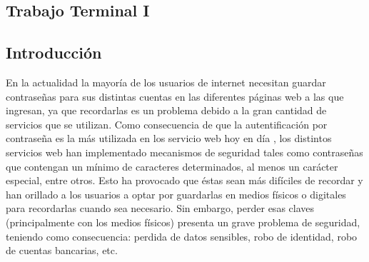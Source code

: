 \documentclass[12pt, a4paper, titlepage]{report}
\begin{document}
	\begin{appendix}
		\renewcommand*\contentsname{{\textcolor{azulescom}{Índice.}}}
		\tableofcontents
		\newpage
		\renewcommand*\listfigurename{{\textcolor{azulescom}{Índice de figuras.}}}
		\listoffigures
		\newpage
		\newpage
		\renewcommand*\listtablename{{\textcolor{azulescom}{Índice de cuadros.}}}
		\listoftables
		
		\newpage
		\renewcommand*\glossaryname{{\textcolor{azulescom}{Glosario.}}}
		
		\printglossary
	\end{appendix}
	
    \textcolor{guindapoli}{\part{Trabajo Terminal I}}
    
    \renewcommand\thechapter{\arabic{chapter}}
    \renewcommand{\appendixname}{Capítulo}
    \chapter{\textcolor{azulescom}{Introducción}}

		
		En la actualidad la mayor\'ia de los usuarios de internet necesitan guardar contraseñas para sus distintas cuentas en las diferentes páginas web a las que ingresan, ya que recordarlas es un problema debido a la gran cantidad de servicios que se utilizan. Como consecuencia de que la autentificaci\'on por contraseña es la más utilizada en los servicio web hoy en día \cite{ComparisonAuthenticationMethodsResources}, los distintos servicios web han implementado mecanismos de seguridad tales como contraseñas que contengan un mínimo de caracteres determinados, al menos un carácter especial, entre otros. Esto ha provocado que éstas sean más difíciles de recordar y han orillado a los usuarios a optar por guardarlas en medios físicos o digitales para recordarlas cuando sea necesario. 
		Sin embargo, perder esas claves (principalmente con los medios físicos) presenta un grave problema de seguridad, teniendo como consecuencia: perdida de datos sensibles, robo de identidad, robo de cuentas bancarias, etc.\\
		
\end{document}
